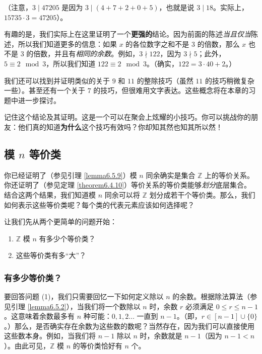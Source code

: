 \begin{example}
    （注意，$3 \mid 47205$ 是因为 $3 \mid (4 + 7 + 2 + 0 + 5)$，也就是说 $3 \mid 18$。实际上，$15735 \cdot 3 = 47205$）。

    有趣的是，我们实际上在这里证明了一个\textbf{更强的}结论。因为前面的陈述\emph{当且仅当}陈述，所以我们知道更多的信息：如果 $x$ 的各位数字之和不是 $3$ 的倍数，那么 $x$ 也不是 $3$ 的倍数，并且有\emph{相同的余数}。例如，$3 \nmid 122$，因为 $3 \nmid 5$；此外，$5 \equiv 2 \mod 3$，所以我们知道 $122 \equiv 2 \mod 3$。（确实，$122 = 3 \cdot 40 + 2$。）

    我们还可以找到并证明类似的关于 $9$ 和 $11$ 的整除技巧（虽然 $11$ 的技巧稍微复杂一些）。甚至还有一个关于 $7$ 的技巧，但很难用文字表达。这些概念将在本章的习题中进一步探讨。
    
    记住这个结论及其证明。这是一个可以在聚会上炫耀的小技巧。你可以挑战你的朋友：他们真的知道\textbf{为什么}这个技巧有效吗？你却知其然也知其所以然！
\end{example}

\subsection{模 $n$ 等价类}

你已经证明了（参见引理 \ref{lemma6.5.9}）模 $n$ 同余确实是集合 $\mathbb{Z}$ 上的等价关系。你还证明了（参见定理 \ref{theorem6.4.10}）等价关系的等价类能够\emph{划分}底层集合。结合这两个结果，我们知道模 $n$ 同余可以将 $\mathbb{Z}$ 划分成若干个等价类。那么，我们如何表示这些等价类呢？每个类的代表元素应该如何选择呢？

让我们先从两个更简单的问题开始：
\begin{enumerate}[label=(\arabic*)]
    \item $\mathbb{Z}$ 模 $n$ 有多少个等价类？
    \item 这些等价类有多``大''？
\end{enumerate}

\subsubsection*{有多少等价类？}

要回答问题 (1)，我们只需要回忆一下如何定义除以 $n$ 的余数。根据除法算法（参见引理 \ref{lemma6.5.2}），当我们将一个数除以 $n$ 时，余数 $r$ 必须满足 $0 \le r \le n-1$。这意味着余数最多有 $n$ 种可能：$0,1,2 \dots$ 一直到 $n-1$。（即，$r \in [n-1] \cup \{0\}$。）那么，是否确实存在余数为这些数的数呢？当然存在，因为我们可以直接使用这些数本身。例如，当我们将 $n-1$ 除以 $n$ 时，余数就是 $n-1$（因为 $n-1 < n$）。由此可见，$\mathbb{Z}$ 模 $n$ 的等价类恰好有 $n$ 个。

